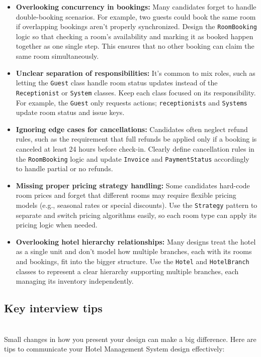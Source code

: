 \begin{itemize}
\item
\protect{}\label{qS63wCpzUFhvGF4MPUCle}
\textbf{Overlooking concurrency in bookings:} Many candidates forget to handle double-booking scenarios. For example, two guests could book the same room if overlapping bookings aren't properly synchronized. Design the \texttt{RoomBooking} logic so that checking a room's availability and marking it as booked happen together as one single step. This ensures that no other booking can claim the same room simultaneously.
\item
\protect{}\label{uII4V45ph5YJL87NMDj8a}
\textbf{Unclear separation of responsibilities:} It's common to mix roles, such as letting the \texttt{Guest} class handle room status updates instead of the \texttt{Receptionist} or \texttt{System} classes. Keep each class focused on its responsibility. For example, the \texttt{Guest} only requests actions; \texttt{receptionists} and \texttt{Systems} update room status and issue keys.
\item
\protect{}\label{FzDTQAjG0MAf5Qw8q8zb7}
\textbf{Ignoring edge cases for cancellations:} Candidates often neglect refund rules, such as the requirement that full refunds be applied only if a booking is canceled at least 24 hours before check-in. Clearly define cancellation rules in the \texttt{RoomBooking} logic and update \texttt{Invoice} and \texttt{PaymentStatus} accordingly to handle partial or no refunds.
\item
\protect{}\label{J-stZlqY2kZXEa-OmxGp5}
\textbf{Missing proper pricing strategy handling:} Some candidates hard-code room prices and forget that different rooms may require flexible pricing models (e.g., seasonal rates or special discounts). Use the \texttt{Strategy} pattern to separate and switch pricing algorithms easily, so each room type can apply its pricing logic when needed.
\item
\protect{}\label{FZrcVb7vateD9HRnR9XUm}
\textbf{Overlooking hotel hierarchy relationships:} Many designs treat the hotel as a single unit and don't model how multiple branches, each with its rooms and bookings, fit into the bigger structure. Use the \texttt{Hotel} and \texttt{HotelBranch} classes to represent a clear hierarchy supporting multiple branches, each managing its inventory independently.
\end{itemize}

\subsection{Key interview tips}\label{UCUsXYsxYIqUCYUSynwVo}
\\
Small changes in how you present your design can make a big difference. Here are tips to communicate your Hotel Management System design effectively:

